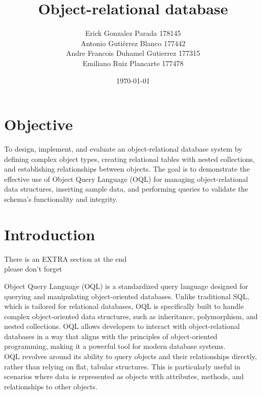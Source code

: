 \documentclass{article}
\begin{document}
\title{Object-relational database}
\author{Erick Gonzalez Parada 178145\\
    Antonio Gutiérrez Blanco 177442\\
    Andre Francois Duhamel Gutierrez 177315\\
    Emiliano Ruiz Plancarte 177478\\ }
\date{\today}

\maketitle

\section{Objective}
\begin{sloppypar}
To design, implement, and evaluate an object-relational database system by defining complex object types, creating relational tables with nested collections, and establishing relationships between objects. The goal is to demonstrate the effective use of Object Query Language (OQL) for managing object-relational data structures, inserting sample data, and performing queries to validate the schema's functionality and integrity.
\end{sloppypar}

\section{Introduction}

\vspace{1cm}

{\Huge{ There is an EXTRA section at the end\\ please don't forget}}

\vspace{1cm}
Object Query Language (OQL) is a standardized query language designed for querying and manipulating object-oriented databases. Unlike traditional SQL, which is tailored for relational databases, OQL is specifically built to handle complex object-oriented data structures, such as inheritance, polymorphism, and nested collections. OQL allows developers to interact with object-relational databases in a way that aligns with the principles of object-oriented programming, making it a powerful tool for modern database systems\cite{ibm}.
\\
OQL revolves around its ability to query objects and their relationships directly, rather than relying on flat, tabular structures. This is particularly useful in scenarios where data is represented as objects with attributes, methods, and relationships to other objects\cite{mendix}.
\end{document}

